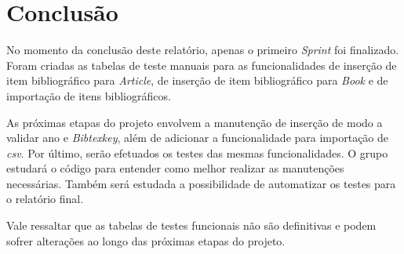 \section{Conclusão}
    No momento da conclusão deste relatório, apenas o primeiro \textit{Sprint} foi finalizado. Foram criadas as tabelas de teste manuais para as funcionalidades de inserção de item bibliográfico para \textit{Article}, de inserção de item bibliográfico para \textit{Book} e de importação de itens bibliográficos.
    \newline
    \par As próximas etapas do projeto envolvem a manutenção de inserção de modo a validar ano e \textit{Bibtexkey}, além de adicionar a funcionalidade para importação de \textit{csv}. Por último, serão efetuados os testes das mesmas funcionalidades. O grupo estudará o código para entender como melhor realizar as manutenções necessárias. Também será estudada a possibilidade de automatizar os testes para o relatório final.
    \newline
    \par Vale ressaltar que as tabelas de testes funcionais não são definitivas e podem sofrer alterações ao longo das próximas etapas do projeto.
